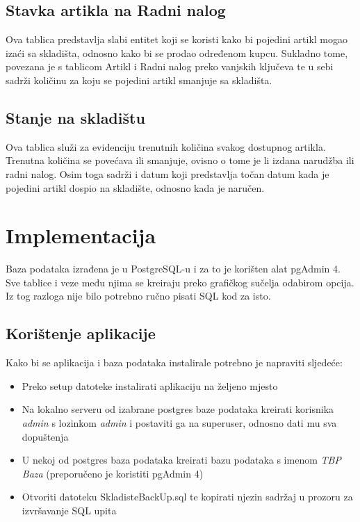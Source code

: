 \documentclass{foi}
\begin{document}
\section{Stavka artikla na Radni nalog}
Ova tablica predstavlja slabi entitet koji se koristi kako bi pojedini artikl mogao izaći sa skladišta, odnosno kako bi se prodao određenom kupcu. Sukladno tome, povezana je s tablicom Artikl i Radni nalog preko vanjskih ključeva te u sebi sadrži količinu za koju se pojedini artikl smanjuje sa skladišta. 

\section{Stanje na skladištu}
Ova tablica služi za evidenciju trenutnih količina svakog dostupnog artikla. Trenutna količina se povećava ili smanjuje, ovisno o tome je li izdana narudžba ili radni nalog. Osim toga sadrži i datum koji predstavlja točan datum kada je pojedini artikl dospio na skladište, odnosno kada je naručen.

\chapter{Implementacija}

Baza podataka izrađena je u PostgreSQL-u i za to je korišten alat pgAdmin 4. Sve tablice i veze među njima se kreiraju preko grafičkog sučelja odabirom opcija. Iz tog razloga nije bilo potrebno ručno pisati SQL kod za isto.

\section{Korištenje aplikacije}

Kako bi se aplikacija i baza podataka instalirale potrebno je napraviti sljedeće:
\begin{itemize}
    \item Preko setup datoteke instalirati aplikaciju na željeno mjesto
    \item Na lokalno serveru od izabrane postgres baze podataka kreirati korisnika \emph{admin}  s lozinkom \emph{admin} i postaviti ga na superuser, odnosno dati mu sva dopuštenja
    \item U nekoj od postgres baza podataka kreirati bazu podataka s imenom \emph{TBP Baza} (preporučeno je koristiti pgAdmin 4)
    \item Otvoriti datoteku SkladisteBackUp.sql te kopirati njezin sadržaj u prozoru za izvršavanje SQL upita
\end{itemize}
\end{document}
